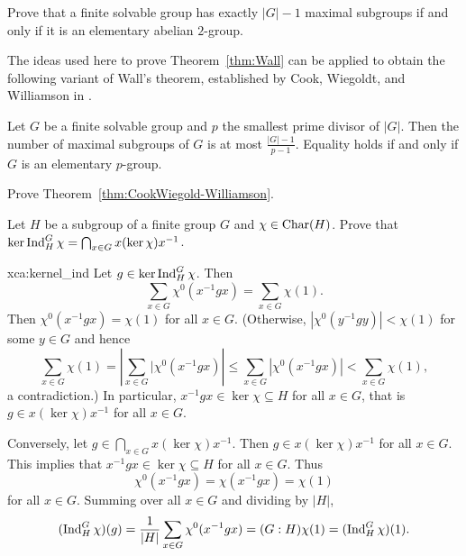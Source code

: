 \begin{exercise}
    Prove that a finite solvable group has exactly $|G|-1$ maximal subgroups
    if and only if it is an elementary abelian $2$-group. 
\end{exercise}

The ideas used here to prove Theorem~\ref{thm:Wall} can be applied 
to obtain the following variant of Wall’s theorem, established  
by Cook, Wiegoldt, and Williamson in \cite{MR896628}.

\begin{theorem}
    \label{thm:CookWiegold-Williamson}
    Let $G$ be a finite solvable group and $p$ the smallest prime divisor of $|G|$. 
    Then the number of maximal subgroups of $G$ is at most $\frac{|G|-1}{p-1}$. Equality 
    holds if and only if $G$ is an elementary $p$-group.  
\end{theorem}

\begin{bonus}
    Prove Theorem~\ref{thm:CookWiegold-Williamson}.    
\end{bonus}

\begin{exercise}
    \label{xca:kernel_ind}
    Let $H$ be a subgroup of a finite group $G$ and 
    $\chi\in\operatorname{Char}(H)$. Prove that 
    $\ker\operatorname{Ind}_H^G\chi=\bigcap_{x\in G}x(\ker\chi)x^{-1}$. 
\end{exercise}

\begin{sol}{xca:kernel_ind}
    Let $g\in\ker\operatorname{Ind}_H^G\chi$. Then \[
    \sum_{x\in G}\chi^0(x^{-1}gx)=\sum_{x\in G}\chi(1).
    \]
    Then $\chi^0(x^{-1}gx)=\chi(1)$ for all $x\in G$. (Otherwise, $|\chi^0(y^{-1}gy)|<\chi(1)$ for some
    $y\in G$ and hence 
    \[
    \sum_{x\in G}\chi(1)=\left|\sum_{x\in G}|\chi^0(x^{-1}gx)\right|
    \leq\sum_{x\in G}|\chi^0(x^{-1}gx)|<\sum_{x\in G}\chi(1),
    \]
    a contradiction.) In particular, $x^{-1}gx\in\ker\chi\subseteq H$ for all $x\in G$, that 
    is $g\in x(\ker\chi)x^{-1}$ for all $x\in G$. 
    
    Conversely, let $g\in\bigcap_{x\in G}x(\ker\chi)x^{-1}$. Then $g\in x(\ker\chi)x^{-1}$ for all $x\in G$. 
    This implies that $x^{-1}gx\in\ker\chi\subseteq H$ for all $x\in G$. Thus 
    \[
    \chi^0(x^{-1}gx)=\chi(x^{-1}gx)=\chi(1)
    \]
    for all $x\in G$. Summing over all $x\in G$ and dividing by $|H|$, 
    \[
    (\operatorname{Ind}_H^G\chi)(g)=\frac{1}{|H|}\sum_{x\in G}\chi^0(x^{-1}gx)=(G:H)\chi(1)=(\operatorname{Ind}_H^G\chi)(1).
    \]
\end{sol}